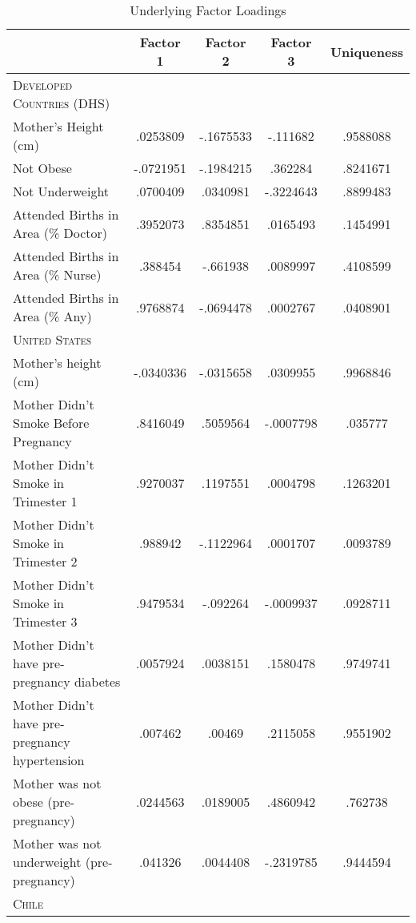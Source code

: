 \documentclass{nature}
\begin{document}
\begin{linenumbers}
\begin{spacing}{1}
\begin{table}
  \begin{center}
    \caption{Underlying Factor Loadings}
    \begin{tabular}{lcccc}
      \toprule
      &     Factor 1&     Factor 2&     Factor 3&  Uniqueness\\
      \midrule
      \textsc{Developed Countries (DHS)} &&&\\
      Mother's Height (cm)&    .0253809&   -.1675533&    -.111682&    .9588088\\
      Not Obese             &   -.0721951&   -.1984215&     .362284&    .8241671\\
      Not Underweight           &    .0700409&    .0340981&   -.3224643&    .8899483\\
      Attended Births in Area (\% Doctor)&    .3952073&    .8354851&    .0165493&    .1454991\\
      Attended Births in Area (\% Nurse)&     .388454&    -.661938&    .0089997&    .4108599\\
      Attended Births in Area (\% Any)&    .9768874&   -.0694478&    .0002767&    .0408901\\
      \midrule
      \textsc{United States} &&&\\
      Mother's height (cm)&   -.0340336&   -.0315658&    .0309955&    .9968846\\
      Mother Didn't Smoke Before Pregnancy&    .8416049&    .5059564&   -.0007798&     .035777\\
      Mother Didn't Smoke in Trimester 1&    .9270037&    .1197551&    .0004798&    .1263201\\
      Mother Didn't Smoke in Trimester 2&     .988942&   -.1122964&    .0001707&    .0093789\\
      Mother Didn't Smoke in Trimester 3&    .9479534&    -.092264&   -.0009937&    .0928711\\
      Mother Didn't have pre-pregnancy diabetes&    .0057924&    .0038151&    .1580478&    .9749741\\
      Mother Didn't have pre-pregnancy hypertension&     .007462&      .00469&    .2115058&    .9551902\\
      Mother was not obese (pre-pregnancy)&    .0244563&    .0189005&    .4860942&     .762738\\
      Mother was not underweight (pre-pregnancy)&     .041326&    .0044408&   -.2319785&    .9444594\\
      \midrule
      \textsc{Chile} &&&\\

\end{tabular}
\end{center}
\end{table}
\end{spacing}
\end{linenumbers}
\end{document}
